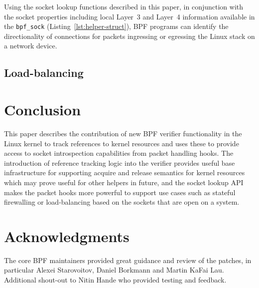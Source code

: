 \documentclass[10pt,sigconf,authorversion]{lpc}
\begin{document}
Using the socket lookup functions described in this paper, in conjunction with
the socket properties including local Layer~3 and Layer~4 information available
in the \verb+bpf_sock+ (Listing~\ref{lst:helper-struct}), BPF programs can
identify the directionality of connections for packets ingressing or egressing
the Linux stack on a network device.

\subsection{Load-balancing}

\section{Conclusion}

This paper describes the contribution of new BPF verifier functionality in the
Linux kernel to track references to kernel resources and uses these to provide
access to socket introspection capabilities from packet handling hooks. The
introduction of reference tracking logic into the verifier provides
useful base infrastructure for supporting acquire and release semantics for
kernel resources which may prove useful for other helpers in future, and the
socket lookup API makes the packet hooks more powerful to support use cases
such as stateful firewalling or load-balancing based on the sockets that are
open on a system.

\section{Acknowledgments}

The core BPF maintainers provided great guidance and review of the patches, in
particular Alexei Starovoitov, Daniel Borkmann and Martin KaFai Lau. Additional
shout-out to Nitin Hande who provided testing and feedback.



\end{document}
